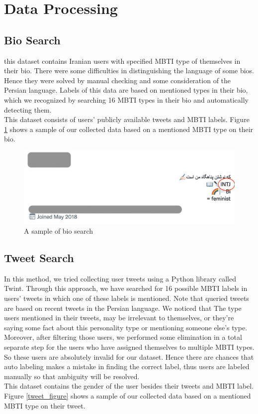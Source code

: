 \documentclass[10pt, a4paper]{article}
\begin{document}
\section{Data Processing}

\subsection{Bio Search}

this dataset contains Iranian users with specified MBTI type of themselves in their bio.
There were some difficulties in distinguishing the language of some bios.
Hence they were solved by manual checking and some consideration of the Persian language.
Labels of this data are based on mentioned types in their bio, which we recognized by searching 16 MBTI types in their bio and automatically detecting them.
\\
This dataset consists of users' publicly available tweets and MBTI labels.
Figure \ref{bio_figure} shows a sample of our collected data based on a mentioned MBTI type on their bio.
\begin{figure}[h]
    \centering
    \includegraphics[width=.95\columnwidth]{images/sample.jpg}
    \caption{A sample of bio search}
    \label{bio_figure}
\end{figure}


\subsection{Tweet Search}
In this method, we tried collecting user tweets using a Python library called Twint.
Through this approach, we have searched for 16 possible MBTI labels in users' tweets in which one of these labels is mentioned.
Note that queried tweets are based on recent tweets in the Persian language.
We noticed that The type users mentioned in their tweets, may be irrelevant to themselves,
or they're saying some fact about this personality type or mentioning someone else's type.
Moreover, after filtering those users, we performed some elimination in a total separate step for the users
who have assigned themselves to multiple MBTI types. So these users are absolutely invalid for our dataset.
Hence there are chances that auto labeling makes a mistake in finding the correct label,
thus users are labeled manually so that ambiguity will be resolved.
\\
This dataset contains the gender of the user besides their tweets and MBTI label.
Figure \ref{tweet_figure} shows a sample of our collected data based on a mentioned MBTI type on their tweet.
\end{document}
